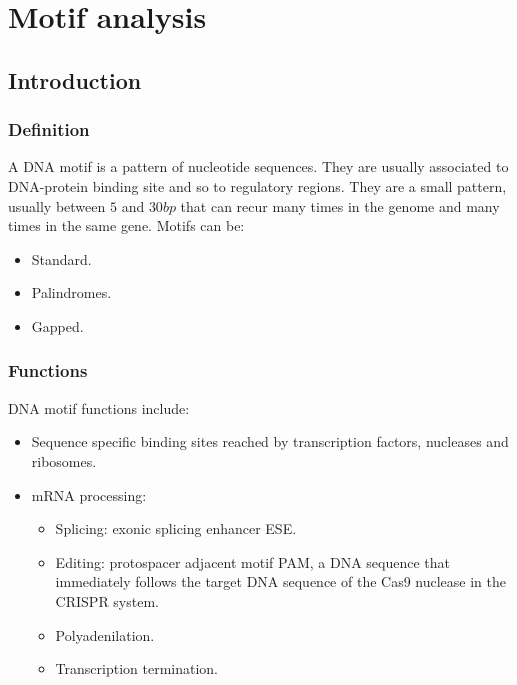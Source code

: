 \chapter{Motif analysis}

\section{Introduction}

	\subsection{Definition}
	A DNA motif is a pattern of nucleotide sequences.
	They are usually associated to DNA-protein binding site and so to regulatory regions.
	They are a small pattern, usually between $5$ and $30bp$ that can recur many times in the genome and many times in the same gene.
	Motifs can be:

	\begin{multicols}{3}
		\begin{itemize}
			\item Standard.
			\item Palindromes.
			\item Gapped.
		\end{itemize}
	\end{multicols}

	\subsection{Functions}
	DNA motif functions include:

	\begin{multicols}{2}
		\begin{itemize}
			\item Sequence specific binding sites reached by transcription factors, nucleases and ribosomes.
			\item mRNA processing:

				\begin{itemize}
					\item Splicing: exonic splicing enhancer ESE.
					\item Editing: protospacer adjacent motif PAM, a DNA sequence that immediately follows the target DNA sequence of the Cas9 nuclease in the CRISPR system.
					\item Polyadenilation.
					\item Transcription termination.
				\end{itemize}

		\end{itemize}
	\end{multicols}

